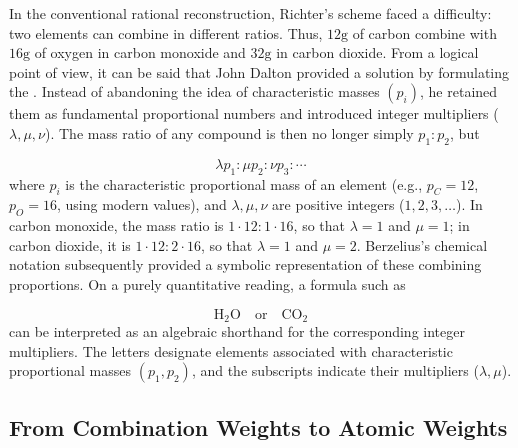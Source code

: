 \documentclass[submitted,12pt]{article}
\begin{document}
In the conventional rational reconstruction, Richter's scheme faced a difficulty: two elements can combine in different ratios. Thus, $12\text{g}$ of carbon combine with $16\text{g}$ of oxygen in carbon monoxide and $32\text{g}$ in carbon dioxide. From a logical point of view, it can be said that John Dalton provided a solution by formulating the . Instead of abandoning the idea of characteristic masses $\left(p_i\right)$, he retained them as fundamental proportional numbers and introduced integer multipliers ($\lambda, \mu, \nu$). The mass ratio of any compound is then no longer simply $p_1: p_2$, but

\begin{equation*}
\lambda p_1 : \mu p_2 : \nu p_3 : \cdots
\end{equation*}
%
where $p_i$ is the characteristic proportional mass of an element (e.g., $p_C=12$, $p_O=16$, using modern values), and $\lambda, \mu, \nu$ are positive integers ($1, 2, 3, \ldots$). In carbon monoxide, the mass ratio is $1 \cdot 12 : 1 \cdot 16$, so that $\lambda=1$ and $\mu=1$; in carbon dioxide, it is $1 \cdot 12 : 2 \cdot 16$, so that $\lambda=1$ and $\mu=2$. Berzelius's chemical notation subsequently provided a symbolic representation of these combining proportions. On a purely quantitative reading, a formula such as

\begin{equation*}
\mathrm{H}_2\mathrm{O} \quad \text{or} \quad \mathrm{CO}_2
\end{equation*}
%
can be interpreted as an algebraic shorthand for the corresponding integer multipliers. The letters designate elements associated with characteristic proportional masses $\left(p_1, p_2\right)$, and the subscripts indicate their multipliers ($\lambda, \mu$).

\subsection{From Combination Weights to Atomic Weights}
\end{document}
